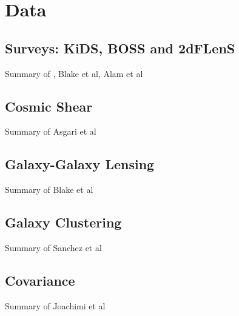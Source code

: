 \section{Data}
\label{sec:data}

\subsection{Surveys:  KiDS, BOSS and 2dFLenS}
\label{sec:surveys}
Summary of \citet{kuijken/etal:2019},  Blake et al, Alam et al

\subsection{Cosmic Shear}
\label{sec:cosmic_shear}
Summary of Asgari et al

\subsection{Galaxy-Galaxy Lensing}
\label{sec:GGL}
Summary of Blake et al

\subsection{Galaxy Clustering}
\label{sec:clustering}
Summary of Sanchez et al

\subsection{Covariance}
\label{sec:Cov}
Summary of Joachimi et al

